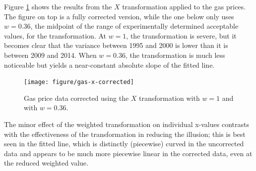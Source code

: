 \documentclass[12pt]{article}\usepackage[]{graphicx}\usepackage[]{color}
\begin{document}




Figure \ref{fig:gasprices-x-correct} shows the results from the $X$ transformation applied to the gas prices. The figure on top is a fully corrected version, while the one below only uses $w=0.36$, the midpoint of the range of experimentally determined acceptable values,  for the transformation. At $w=1$, the transformation is severe, but it becomes clear that the variance between 1995 and 2000 is lower than it is between 2009 and 2014. When $w=0.36$, the transformation is much less noticeable but yields a near-constant absolute slope of the fitted line.
\begin{figure}
\centering
\texttt{[image: figure/gas-x-corrected]}
\caption{Gas price data corrected using the $X$ transformation with $w=1$ and with $w=0.36$. }
\label{fig:gasprices-x-correct}
\end{figure}
The minor effect of the weighted transformation on individual x-values contrasts with the effectiveness of the transformation in reducing the illusion; this is best seen in the fitted line, which is distinctly (piecewise) curved in the uncorrected data and appears to be much more piecewise linear in the corrected data, even at the reduced weighted value. 
\end{document}
